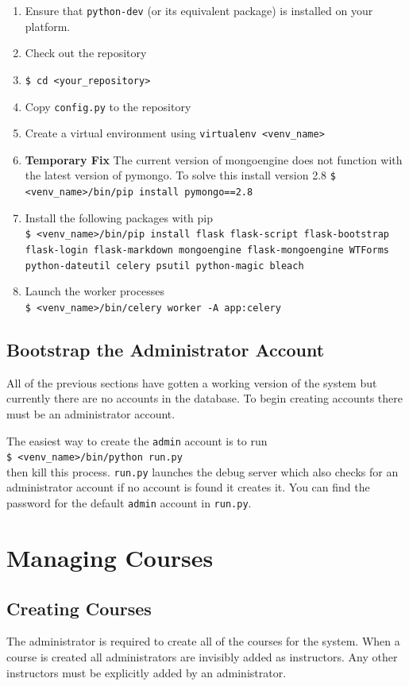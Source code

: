 \documentclass[11pt]{report}
\begin{document}
\begin{enumerate}
\item Ensure that \verb|python-dev| (or its equivalent package) is installed on your platform.
\item Check out the repository
\item \verb|$ cd <your_repository>|
\item Copy \texttt{config.py} to the repository
\item Create a virtual environment using \verb|virtualenv <venv_name>|
\item \textbf{Temporary Fix} The current version of mongoengine does not function with the latest version
of pymongo. To solve this install version 2.8 \verb|$ <venv_name>/bin/pip install pymongo==2.8|
\item Install the following packages with pip\\
\texttt{\$ <venv\_name>/bin/pip install flask flask-script flask-bootstrap flask-login flask-markdown mongoengine flask-mongoengine WTForms python-dateutil celery psutil python-magic bleach}
\item Launch the worker processes\\
\verb|$ <venv_name>/bin/celery worker -A app:celery|
\end{enumerate}

\subsection{Bootstrap the Administrator Account}
All of the previous sections have gotten a working version of the system but currently there are no accounts
in the database. To begin creating accounts there must be an administrator account.

The easiest way to create the \texttt{admin} account is to run\\
\verb|$ <venv_name>/bin/python run.py|\\
then kill this process. \texttt{run.py} launches the debug server which also checks for an administrator account
if no account is found it creates it. You can find the password for the default \texttt{admin} account in
\texttt{run.py}.





\section{Managing Courses}
\subsection{Creating Courses}
The administrator is required to create all of the courses for the system. When a course is created all administrators are invisibly added as instructors. Any other instructors must be explicitly added by an
administrator.
\end{document}
